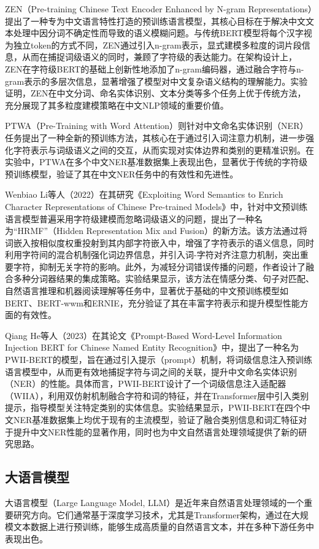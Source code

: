 \documentclass[12pt, a4paper]{ctexart}
\begin{document}
ZEN（Pre-training Chinese Text Encoder Enhanced by N-gram Representations）提出了一种专为中文语言特性打造的预训练语言模型，其核心目标在于解决中文文本处理中因分词不确定性而导致的语义模糊问题\cite{diao-etal-2020-zen}。与传统BERT模型将每个汉字视为独立token的方式不同，ZEN通过引入n-gram表示，显式建模多粒度的词片段信息，从而在捕捉词级语义的同时，兼顾了字符级的表达能力。在架构设计上，ZEN在字符级BERT的基础上创新性地添加了n-gram编码器，通过融合字符与n-gram表示的多层次信息，显著增强了模型对中文复杂语义结构的理解能力。实验证明，ZEN在中文分词、命名实体识别、文本分类等多个任务上优于传统方法，充分展现了其多粒度建模策略在中文NLP领域的重要价值。

PTWA（Pre-Training with Word Attention）则针对中文命名实体识别（NER）任务提出了一种全新的预训练方法，其核心在于通过引入词注意力机制，进一步强化字符表示与词级语义之间的交互，从而实现对实体边界和类别的更精准识别\cite{Ma2021PTWAPW}。在实验中，PTWA在多个中文NER基准数据集上表现出色，显著优于传统的字符级预训练模型，验证了其在中文NER任务中的有效性和先进性。

Wenbiao Li等人（2022）在其研究《Exploiting Word Semantics to Enrich Character Representations of Chinese Pre-trained Models》中，针对中文预训练语言模型普遍采用字符级建模而忽略词级语义的问题，提出了一种名为“HRMF”（Hidden Representation Mix and Fusion）的新方法\cite{Li2022ExploitingWS}。该方法通过将词嵌入按相似度权重投射到其内部字符嵌入中，增强了字符表示的语义信息，同时利用字符间的混合机制强化词边界信息，并引入词-字符对齐注意力机制，突出重要字符，抑制无关字符的影响。此外，为减轻分词错误传播的问题，作者设计了融合多种分词器结果的集成策略。实验结果显示，该方法在情感分类、句子对匹配、自然语言推理和机器阅读理解等任务中，显著优于基础的中文预训练模型如BERT、BERT-wwm和ERNIE，充分验证了其在丰富字符表示和提升模型性能方面的有效性。

Qiang He等人（2023）在其论文《Prompt-Based Word-Level Information Injection BERT for Chinese Named Entity Recognition》中，提出了一种名为PWII-BERT的模型，旨在通过引入提示（prompt）机制，将词级信息注入预训练语言模型中，从而更有效地捕捉字符与词之间的关联，提升中文命名实体识别（NER）的性能\cite{He2023PromptBasedWI}。具体而言，PWII-BERT设计了一个词级信息注入适配器（WIIA），利用双仿射机制融合字符和词的特征，并在Transformer层中引入类别提示，指导模型关注特定类别的实体信息。实验结果显示，PWII-BERT在四个中文NER基准数据集上均优于现有的主流模型，验证了融合类别信息和词汇特征对于提升中文NER性能的显著作用，同时也为中文自然语言处理领域提供了新的研究思路。

\subsection{大语言模型}
大语言模型（Large Language Model, LLM）是近年来自然语言处理领域的一个重要研究方向。它们通常基于深度学习技术，尤其是Transformer架构，通过在大规模文本数据上进行预训练，能够生成高质量的自然语言文本，并在多种下游任务中表现出色。
\end{document}
